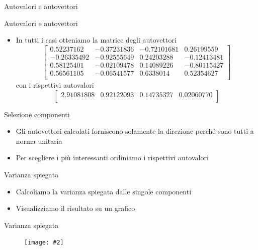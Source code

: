 \documentclass[xcolor={dvipsnames}]{beamer}
\newcommand{\codice}[2]{}
\newcommand{\figcen}[2]{
	\begin{figure}
		\begin{center}
			\texttt{[image: \#2]}
		\end{center}
	\end{figure}
}
\begin{document}
		\begin{frame}{Autovalori e autovettori}
			\codice{61}{82}
		\end{frame}
	
		\begin{frame}{Autovalori e autovettori}
			\codice{84}{94}
			\begin{itemize}
				\item In tutti i casi otteniamo la matrice degli autovettori $$\begin{bmatrix}
				0.52237162 & -0.37231836 & -0.72101681 & 0.26199559\\
				-0.26335492 & -0.92555649 & 0.24203288 & -0.12413481\\
				0.58125401 & -0.02109478 & 0.14089226 & -0.80115427\\
				0.56561105 & -0.06541577 & 0.6338014 & 0.52354627\\
				\end{bmatrix}$$
				con i rispettivi autovalori $$\begin{bmatrix}
				2.91081808 & 0.92122093 & 0.14735327 & 0.02060770\\
				\end{bmatrix}$$
			\end{itemize}
		\end{frame}
	
		\begin{frame}{Selezione componenti}
			\begin{itemize}
				\item Gli autovettori calcolati forniscono solamente la direzione perché sono tutti a norma unitaria
				\item Per scegliere i più interessanti ordiniamo i rispettivi autovalori
			\end{itemize}
			\codice{96}{102}
		\end{frame}

		\begin{frame}{Varianza spiegata}
			\begin{itemize}
				\item Calcoliamo la varianza spiegata dalle singole componenti
				\item Visualizziamo il risultato su un grafico
			\end{itemize}
			\codice{108}{123}
		\end{frame}

		\begin{frame}{Varianza spiegata}
			\figcen{.75\textwidth}{istoVarianza}
		\end{frame}
	
\end{document}

